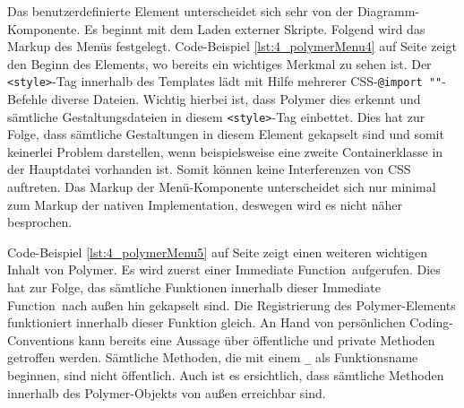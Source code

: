 Das benutzerdefinierte Element unterscheidet sich sehr von der Diagramm-Komponente. Es beginnt mit dem Laden externer Skripte. Folgend wird das Markup des Menüs festgelegt. Code-Beispiel \ref{lst:4_polymerMenu4} auf Seite \pageref{lst:4_polymerMenu4} zeigt den Beginn des Elements, wo bereits ein wichtiges Merkmal zu sehen ist. Der \lstinline|<style>|-Tag innerhalb des Templates lädt mit Hilfe mehrerer CSS-\lstinline|@import ""|-Befehle diverse Dateien. Wichtig hierbei ist, dass Polymer dies erkennt und sämtliche Gestaltungsdateien in diesem \lstinline|<style>|-Tag einbettet. Dies hat zur Folge, dass sämtliche Gestaltungen in diesem Element gekapselt sind und somit keinerlei Problem darstellen, wenn beispielsweise eine zweite Containerklasse in der Hauptdatei vorhanden ist. Somit können keine Interferenzen von CSS auftreten. Das Markup der Menü-Komponente unterscheidet sich nur minimal zum Markup der nativen Implementation, deswegen wird es nicht näher besprochen.

Code-Beispiel \ref{lst:4_polymerMenu5} auf Seite \pageref{lst:4_polymerMenu5} zeigt einen weiteren wichtigen Inhalt von Polymer. Es wird zuerst einer \glqq Immediate Function\grqq\ aufgerufen. Dies hat zur Folge, das sämtliche Funktionen innerhalb dieser \glqq Immediate Function\grqq\ nach außen hin gekapselt sind. Die Registrierung des Polymer-Elements funktioniert innerhalb dieser Funktion gleich. An Hand von persönlichen Coding-Conventions kann bereits eine Aussage über öffentliche und private Methoden getroffen werden. Sämtliche Methoden, die mit einem \lstinline|_| als Funktionsname beginnen, sind nicht öffentlich. Auch ist es ersichtlich, dass sämtliche Methoden innerhalb des Polymer-Objekts von außen erreichbar sind.





